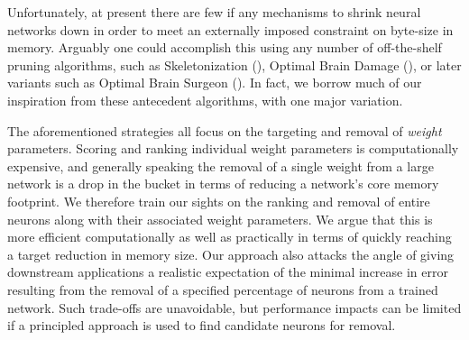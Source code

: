 Unfortunately, at present there are few if any mechanisms to shrink neural networks down in order to meet an externally imposed constraint on byte-size in memory. Arguably one could accomplish this using any number of off-the-shelf pruning algorithms, such as Skeletonization (\cite{mozer1989skeletonization}), Optimal Brain Damage (\cite{lecun1989optimal}), or later variants such as Optimal Brain Surgeon (\cite{hassibi1993second}). In fact, we borrow much of our inspiration from these antecedent algorithms, with one major variation. 


The aforementioned strategies all focus on the targeting and removal of \textit{weight} parameters. Scoring and ranking individual weight parameters is computationally expensive, and generally speaking the removal of a single weight from a large network is a drop in the bucket in terms of reducing a network's core memory footprint. We therefore train our sights on the ranking and removal of entire neurons along with their associated weight parameters. We argue that this is more efficient computationally as well as practically in terms of quickly reaching a target reduction in memory size. Our approach also attacks the angle of giving downstream applications a realistic expectation of the minimal increase in error resulting from the removal of a specified percentage of neurons from a trained network. Such trade-offs are unavoidable, but performance impacts can be limited if a principled approach is used to find candidate neurons for removal. 


